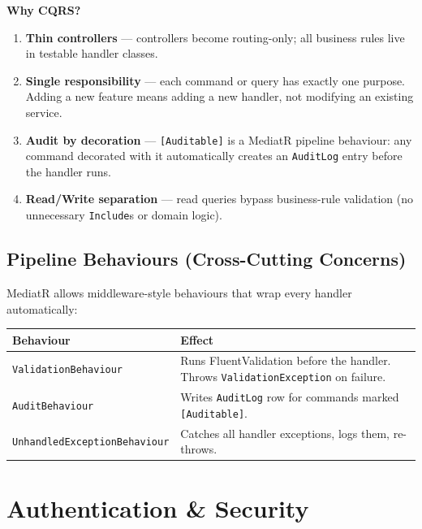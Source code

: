 \documentclass[11pt,a4paper]{article}
\begin{document}
\begin{whybox}
\textbf{Why CQRS?}
\begin{enumerate}
  \item \textbf{Thin controllers} --- controllers become routing-only;
    all business rules live in testable handler classes.
  \item \textbf{Single responsibility} --- each command or query has exactly
    one purpose. Adding a new feature means adding a new handler, not modifying
    an existing service.
  \item \textbf{Audit by decoration} --- \texttt{[Auditable]} is a MediatR
    pipeline behaviour: any command decorated with it automatically creates an
    \texttt{AuditLog} entry before the handler runs.
  \item \textbf{Read/Write separation} --- read queries bypass business-rule
    validation (no unnecessary \texttt{Include}s or domain logic).
\end{enumerate}
\end{whybox}

\subsection{Pipeline Behaviours (Cross-Cutting Concerns)}

MediatR allows middleware-style behaviours that wrap every handler automatically:

\begin{center}
\begin{tabular}{lp{9cm}}
\toprule
\textbf{Behaviour} & \textbf{Effect}\\
\midrule
\texttt{ValidationBehaviour} & Runs FluentValidation before the handler. Throws \texttt{ValidationException} on failure.\\
\texttt{AuditBehaviour} & Writes \texttt{AuditLog} row for commands marked \texttt{[Auditable]}.\\
\texttt{UnhandledExceptionBehaviour} & Catches all handler exceptions, logs them, re-throws.\\
\bottomrule
\end{tabular}
\end{center}

\section{Authentication \& Security}
\end{document}
